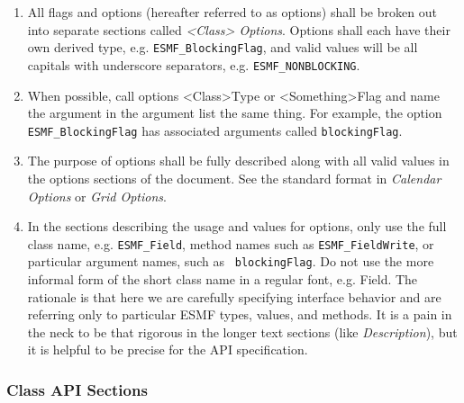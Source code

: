 \begin{enumerate}
\item All flags and options (hereafter referred to as options) 
shall be broken out into separate sections called {\it <Class> Options}.  
Options shall each have their own derived type, 
e.g. {\tt ESMF\_BlockingFlag}, and valid values will be all capitals
with underscore separators, e.g. {\tt ESMF\_NONBLOCKING}.

\item When possible, call options <Class>Type or <Something>Flag and
name the argument in the argument list the same thing.  For example,
the option {\tt ESMF\_BlockingFlag} has associated arguments 
called {\tt blockingFlag}.

\item The purpose of options shall be fully described along with all 
valid values in the options sections of the document.  See the
standard format in {\it Calendar Options} or {\it Grid Options}.

\item In the sections describing the usage and values for options, 
only use the full class name, e.g. {\tt ESMF\_Field}, method names such
as {\tt ESMF\_FieldWrite}, or particular argument names, such as {\tt
blockingFlag}. Do not use the more informal form of the short class
name in a regular font, e.g. Field.  The rationale is that here we 
are carefully specifying interface behavior and are referring only 
to particular ESMF types, values, and methods.  It is a pain in 
the neck to be that rigorous in the longer text sections 
(like {\it Description}), but it is helpful to be precise for the 
API specification.
\end{enumerate}

\subsubsection{Class API Sections}

